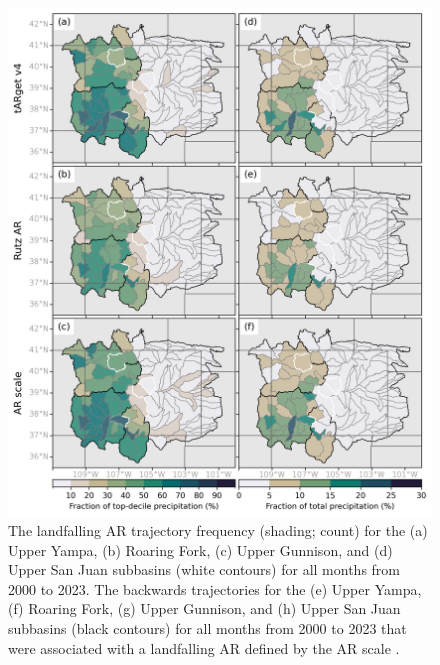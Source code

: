 \documentclass[draft]{agujournal2019}
\begin{document}

\begin{figure}
\noindent\includegraphics[width=\textwidth, height=\textheight, keepaspectratio]{fig6.png}
\caption{The landfalling AR trajectory frequency (shading; count) for the (a) Upper Yampa, (b) Roaring Fork, (c) Upper Gunnison, and (d) Upper San Juan subbasins (white contours) for all months from 2000 to 2023. The backwards trajectories for the (e) Upper Yampa, (f) Roaring Fork, (g) Upper Gunnison, and (h) Upper San Juan subbasins (black contours) for all months from 2000 to 2023 that were associated with a landfalling AR defined by the AR scale \cite{MartinRalph2019}.}
\label{fig:individual_subbasins}
\end{figure}
\end{document}
